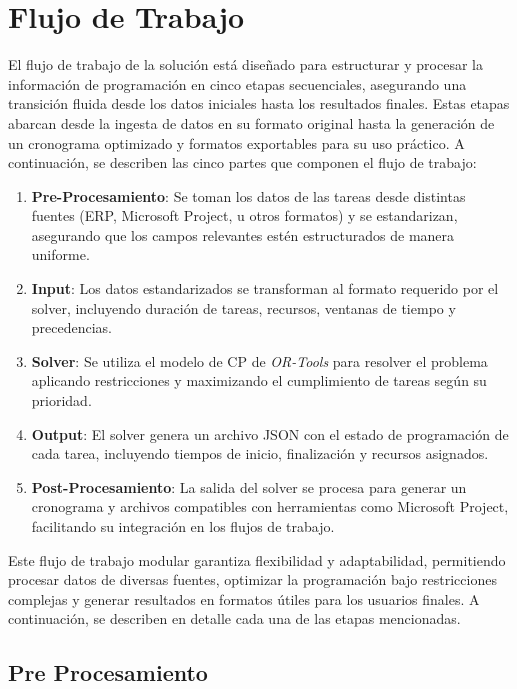 \documentclass{article}
\begin{document}
\section{Flujo de Trabajo}

El flujo de trabajo de la solución está diseñado para estructurar y procesar la información de programación en cinco etapas secuenciales, asegurando una transición fluida desde los datos iniciales hasta los resultados finales. Estas etapas abarcan desde la ingesta de datos en su formato original hasta la generación de un cronograma optimizado y formatos exportables para su uso práctico. A continuación, se describen las cinco partes que componen el flujo de trabajo:

\begin{enumerate}
    \item \textbf{Pre-Procesamiento}: Se toman los datos de las tareas desde distintas fuentes (ERP, Microsoft Project, u otros formatos) y se estandarizan, asegurando que los campos relevantes estén estructurados de manera uniforme.

    \item \textbf{Input}: Los datos estandarizados se transforman al formato requerido por el solver, incluyendo duración de tareas, recursos, ventanas de tiempo y precedencias.

    \item \textbf{Solver}: Se utiliza el modelo de CP de \textit{OR-Tools} para resolver el problema aplicando restricciones y maximizando el cumplimiento de tareas según su prioridad.

    \item \textbf{Output}: El solver genera un archivo JSON con el estado de programación de cada tarea, incluyendo tiempos de inicio, finalización y recursos asignados.

    \item \textbf{Post-Procesamiento}: La salida del solver se procesa para generar un cronograma y archivos compatibles con herramientas como Microsoft Project, facilitando su integración en los flujos de trabajo.
\end{enumerate}

Este flujo de trabajo modular garantiza flexibilidad y adaptabilidad, permitiendo procesar datos de diversas fuentes, optimizar la programación bajo restricciones complejas y generar resultados en formatos útiles para los usuarios finales. A continuación, se describen en detalle cada una de las etapas mencionadas.


\subsection{Pre Procesamiento}
\end{document}
